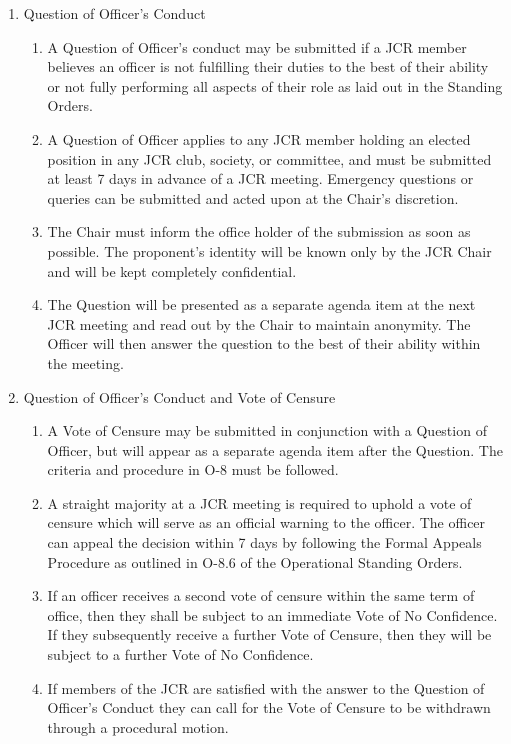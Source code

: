 \begin{enumerate}
    \item Question of Officer's Conduct
    \begin{enumerate}
        \item A Question of Officer’s conduct may be submitted if a JCR member believes an officer is not fulfilling their duties to the best of their ability or not fully performing all aspects of their role as laid out in the Standing Orders.
        \item A Question of Officer applies to any JCR member holding an elected position in any JCR club, society, or committee, and must be submitted at least 7 days in advance of a JCR meeting. Emergency questions or queries can be submitted and acted upon at the Chair’s discretion.
        \item The Chair must inform the office holder of the submission as soon as possible. The proponent’s identity will be known only by the JCR Chair and will be kept completely confidential.
        \item The Question will be presented as a separate agenda item at the next JCR meeting and read out by the Chair to maintain anonymity. The Officer will then answer the question to the best of their ability within the meeting.
    \end{enumerate}
    \item Question of Officer's Conduct and Vote of Censure
    \begin{enumerate}
        \item A Vote of Censure may be submitted in conjunction with a Question of Officer, but will appear as a separate agenda item after the Question. The criteria and procedure in O-8 must be followed.
        \item A straight majority at a JCR meeting is required to uphold a vote of censure which will serve as an official warning to the officer. The officer can appeal the decision within 7 days by following the Formal Appeals Procedure as outlined in O-8.6 of the Operational Standing Orders.
        \item If an officer receives a second vote of censure within the same term of office, then they shall be subject to an immediate Vote of No Confidence. If they subsequently receive a further Vote of Censure, then they will be subject to a further Vote of No Confidence.
        \item If members of the JCR are satisfied with the answer to the Question of Officer’s Conduct they can call for the Vote of Censure to be withdrawn through a procedural motion.

\end{enumerate}
\end{enumerate}
